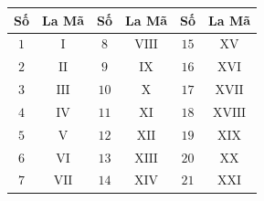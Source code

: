 \documentclass[11pt,a4paper]{article}
\begin{document}
\begin{minipage}[t]{0.49\textwidth}\vspace{0pt}
\begin{tcolorbox}[
  enhanced,
  colback=teal!4!white,
  colframe=teal!75!black,
  arc=2mm, boxrule=0.8pt,
  left=2mm, right=2mm, top=1.8mm, bottom=1.8mm,
  title={\footnotesize\bfseries\color{white}\faClockO\ 2. Bảng đối chiếu các số từ 1 đến 20}
]
{\footnotesize
\begin{center}
\renewcommand{\arraystretch}{1.1}
\begin{tabular}{|c|c||c|c||c|c|}
  \hline
  \textbf{Số} & \textbf{La Mã} & \textbf{Số} & \textbf{La Mã} & \textbf{Số} & \textbf{La Mã} \\
  \hline
  $1$ & $\text{I}$ & $8$ & $\text{VIII}$ & $15$ & $\text{XV}$ \\
  $2$ & $\text{II}$ & $9$ & $\text{IX}$ & $16$ & $\text{XVI}$ \\
  $3$ & $\text{III}$ & $10$ & $\text{X}$ & $17$ & $\text{XVII}$ \\
  $4$ & $\text{IV}$ & $11$ & $\text{XI}$ & $18$ & $\text{XVIII}$ \\
  $5$ & $\text{V}$ & $12$ & $\text{XII}$ & $19$ & $\text{XIX}$ \\
  $6$ & $\text{VI}$ & $13$ & $\text{XIII}$ & $20$ & $\text{XX}$ \\
  $7$ & $\text{VII}$ & $14$ & $\text{XIV}$ & $21$ & $\text{XXI}$ \\
  \hline
\end{tabular}
\end{center}
}
\end{tcolorbox}
\end{minipage}
\end{document}
